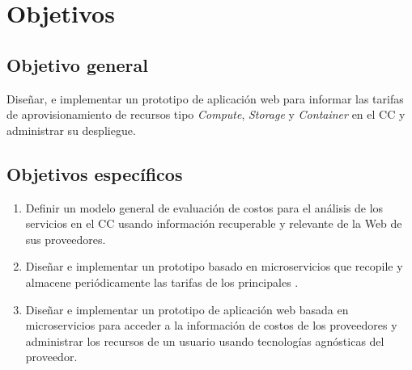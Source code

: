 \chapter{Objetivos} %

\label{ch:objetivos} %



\section{Objetivo general}
Diseñar, e implementar un prototipo de aplicación web para informar las tarifas de aprovisionamiento de recursos tipo \emph{Compute}, \emph{Storage} y \emph{Container} en el \acrshort{CC} y administrar su despliegue.\bigskip

\section{Objetivos específicos}
\begin{enumerate}
    \item Definir un modelo general de evaluación de costos para el análisis de los servicios en el \acrshort{CC} usando información recuperable y relevante de la Web de sus proveedores.
    
    \item Diseñar e implementar un prototipo basado en microservicios que recopile y almacene periódicamente las tarifas de los principales .
    
    \item Diseñar e implementar un prototipo de aplicación web basada en microservicios para acceder a la información de costos de los proveedores y administrar los recursos de un usuario usando tecnologías agnósticas del proveedor.
    
\end{enumerate}